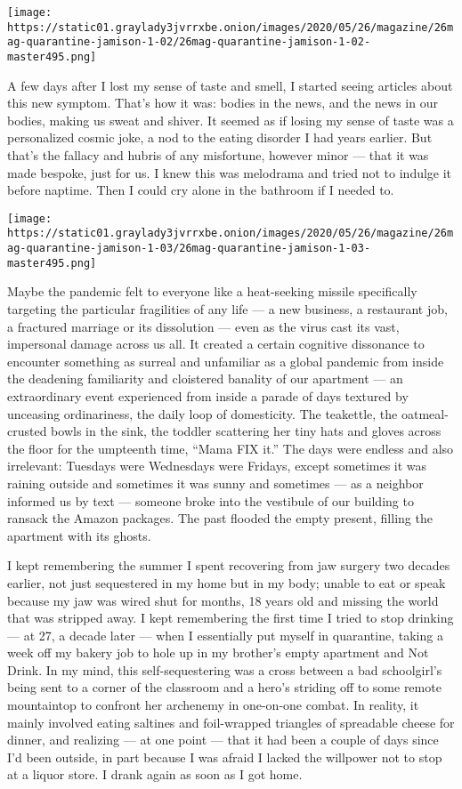\texttt{[image: https://static01.graylady3jvrrxbe.onion/images/2020/05/26/magazine/26mag-quarantine-jamison-1-02/26mag-quarantine-jamison-1-02-master495.png]}

A few days after I lost my sense of taste and smell, I started seeing
articles about this new symptom. That's how it was: bodies in the news,
and the news in our bodies, making us sweat and shiver. It seemed as if
losing my sense of taste was a personalized cosmic joke, a nod to the
eating disorder I had years earlier. But that's the fallacy and hubris
of any misfortune, however minor --- that it was made bespoke, just for
us. I knew this was melodrama and tried not to indulge it before
naptime. Then I could cry alone in the bathroom if I needed to.

\texttt{[image: https://static01.graylady3jvrrxbe.onion/images/2020/05/26/magazine/26mag-quarantine-jamison-1-03/26mag-quarantine-jamison-1-03-master495.png]}

Maybe the pandemic felt to everyone like a heat-seeking missile
specifically targeting the particular fragilities of any life --- a new
business, a restaurant job, a fractured marriage or its dissolution ---
even as the virus cast its vast, impersonal damage across us all. It
created a certain cognitive dissonance to encounter something as surreal
and unfamiliar as a global pandemic from inside the deadening
familiarity and cloistered banality of our apartment --- an
extraordinary event experienced from inside a parade of days textured by
unceasing ordinariness, the daily loop of domesticity. The teakettle,
the oatmeal-crusted bowls in the sink, the toddler scattering her tiny
hats and gloves across the floor for the umpteenth time, ``Mama FIX
it.'' The days were endless and also irrelevant: Tuesdays were
Wednesdays were Fridays, except sometimes it was raining outside and
sometimes it was sunny and sometimes --- as a neighbor informed us by
text --- someone broke into the vestibule of our building to ransack the
Amazon packages. The past flooded the empty present, filling the
apartment with its ghosts.

I kept remembering the summer I spent recovering from jaw surgery two
decades earlier, not just sequestered in my home but in my body; unable
to eat or speak because my jaw was wired shut for months, 18 years old
and missing the world that was stripped away. I kept remembering the
first time I tried to stop drinking --- at 27, a decade later --- when I
essentially put myself in quarantine, taking a week off my bakery job to
hole up in my brother's empty apartment and Not Drink. In my mind, this
self-sequestering was a cross between a bad schoolgirl's being sent to a
corner of the classroom and a hero's striding off to some remote
mountaintop to confront her archenemy in one-on-one combat. In reality,
it mainly involved eating saltines and foil-wrapped triangles of
spreadable cheese for dinner, and realizing --- at one point --- that it
had been a couple of days since I'd been outside, in part because I was
afraid I lacked the willpower not to stop at a liquor store. I drank
again as soon as I got home.

